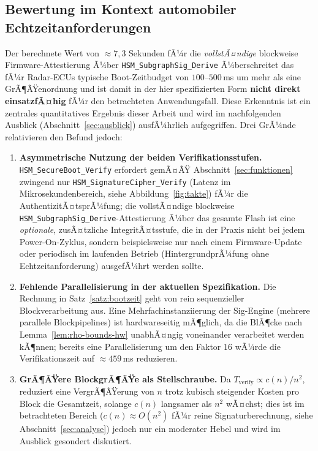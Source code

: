 ﻿\documentclass[a4paper,12pt]{article}
\theoremstyle{definition}
\begin{document}
\subsection{Bewertung im Kontext automobiler Echtzeitanforderungen}

Der berechnete Wert von $\approx 7{,}3$ Sekunden fÃ¼r die \emph{vollstÃ¤ndige} blockweise Firmware-Attestierung Ã¼ber \texttt{HSM\_SubgraphSig\_Derive} Ã¼berschreitet das fÃ¼r Radar-ECUs typische Boot-Zeitbudget von $100$--$500$\,ms um mehr als eine GrÃ¶ÃŸenordnung und ist damit in der hier spezifizierten Form \textbf{nicht direkt einsatzfÃ¤hig} fÃ¼r den betrachteten Anwendungsfall. Diese Erkenntnis ist ein zentrales quantitatives Ergebnis dieser Arbeit und wird im nachfolgenden Ausblick (Abschnitt~\ref{sec:ausblick}) ausfÃ¼hrlich aufgegriffen. Drei GrÃ¼nde relativieren den Befund jedoch:

\begin{enumerate}
	\item \textbf{Asymmetrische Nutzung der beiden Verifikationsstufen.} \texttt{HSM\_SecureBoot\_Verify} erfordert gemÃ¤ÃŸ Abschnitt~\ref{sec:funktionen} zwingend nur \texttt{HSM\_SignatureCipher\_Verify} (Latenz im Mikrosekundenbereich, siehe Abbildung~\ref{fig:takte}) fÃ¼r die AuthentizitÃ¤tsprÃ¼fung; die vollstÃ¤ndige blockweise \texttt{HSM\_SubgraphSig\_Derive}-Attestierung Ã¼ber das gesamte Flash ist eine \emph{optionale}, zusÃ¤tzliche IntegritÃ¤tsstufe, die in der Praxis nicht bei jedem Power-On-Zyklus, sondern beispielsweise nur nach einem Firmware-Update oder periodisch im laufenden Betrieb (HintergrundprÃ¼fung ohne Echtzeitanforderung) ausgefÃ¼hrt werden sollte.
	\item \textbf{Fehlende Parallelisierung in der aktuellen Spezifikation.} Die Rechnung in Satz~\ref{satz:bootzeit} geht von rein sequenzieller Blockverarbeitung aus. Eine Mehrfachinstanziierung der Sig-Engine (mehrere parallele Blockpipelines) ist hardwareseitig mÃ¶glich, da die BlÃ¶cke nach Lemma~\ref{lem:rho-bounds-hw} unabhÃ¤ngig voneinander verarbeitet werden kÃ¶nnen; bereits eine Parallelisierung um den Faktor $16$ wÃ¼rde die Verifikationszeit auf $\approx 459$\,ms reduzieren.
	\item \textbf{GrÃ¶ÃŸere BlockgrÃ¶ÃŸe als Stellschraube.} Da $T_{\mathrm{verify}} \propto c(n)/n^2$, reduziert eine VergrÃ¶ÃŸerung von $n$ trotz kubisch steigender Kosten pro Block die Gesamtzeit, solange $c(n)$ langsamer als $n^2$ wÃ¤chst; dies ist im betrachteten Bereich ($c(n) \approx O(n^2)$ fÃ¼r reine Signaturberechnung, siehe Abschnitt~\ref{sec:analyse}) jedoch nur ein moderater Hebel und wird im Ausblick gesondert diskutiert.
\end{enumerate}
\end{document}
